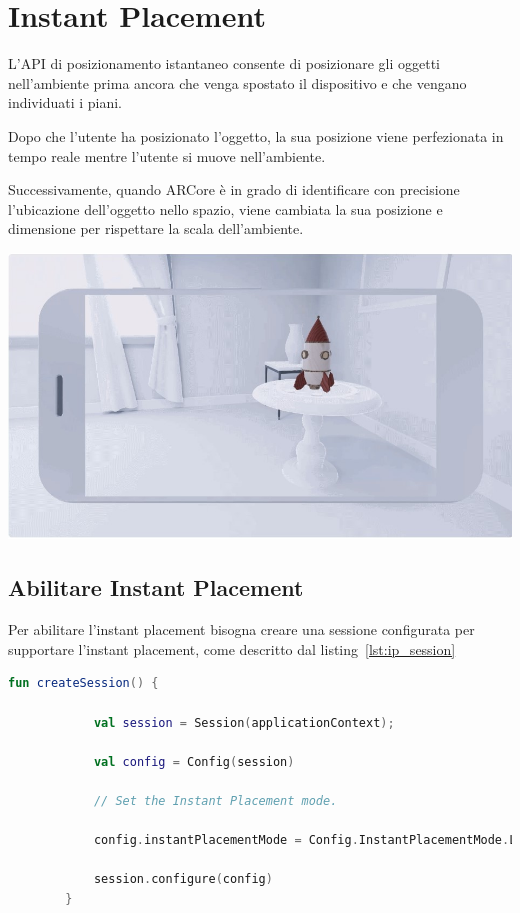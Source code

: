 \documentclass[crop=false, class=book]{standalone}
\begin{document}
	\chapter{Instant Placement}
	L'API di posizionamento istantaneo consente di posizionare gli oggetti nell’ambiente prima ancora che venga spostato il dispositivo e che vengano individuati i piani.
	
	Dopo che l’utente ha posizionato l’oggetto, la sua posizione viene perfezionata in tempo reale mentre l’utente si muove nell’ambiente.
	
	Successivamente, quando ARCore è in grado di identificare con precisione l’ubicazione dell’oggetto nello spazio, viene cambiata la sua posizione e dimensione per rispettare la scala dell’ambiente.
	\begin{center}
	\includegraphics[scale=0.7]{InstantPlacementImg.jpg} 
	\end{center}
	\section{Abilitare Instant Placement}
	Per abilitare l’instant placement bisogna creare una sessione configurata per supportare l’instant placement, come descritto dal listing~\vref{lst:ip_session}
		
	\begin{center}
		\begin{minipage}{0.95\textwidth}
		\begin{lstlisting}[caption={Descrizione del listing.}, label={lst:ip_session}, language=Kotlin]
		fun createSession() {
		
			val session = Session(applicationContext);
			
			val config = Config(session)
			
			// Set the Instant Placement mode.
			
			config.instantPlacementMode = Config.InstantPlacementMode.LOCAL_Y_UP
			
			session.configure(config)
		}
		\end{lstlisting}
		\end{minipage}
	\end{center}
\end{document}
